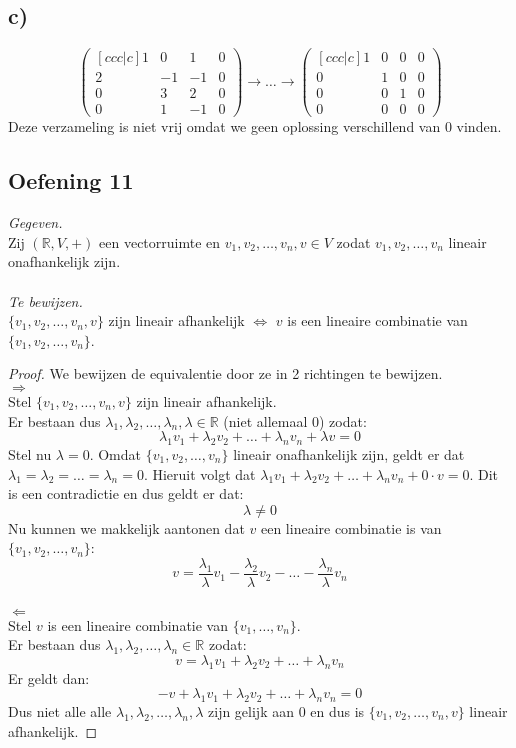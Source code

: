 \documentclass[lineaire_algebra_oplossingen.tex]{subfiles}
\begin{document}
\subsection*{c)}
\[
\begin{pmatrix}[ccc|c]
1 &  0 &  1 & 0 \\
2 & -1 & -1 & 0 \\
0 &  3 &  2 & 0 \\
0 &  1 & -1 & 0
\end{pmatrix}
\longrightarrow
\dots
\longrightarrow
\begin{pmatrix}[ccc|c]
1 & 0 & 0 & 0 \\
0 & 1 & 0 & 0 \\
0 & 0 & 1 & 0 \\
0 & 0 & 0 & 0
\end{pmatrix}
\]
Deze verzameling is niet vrij omdat we geen oplossing verschillend van 0 vinden.

\subsection{Oefening 11}
\textit{Gegeven.}\\
Zij $(\mathbb{R},V,+)$ een vectorruimte en $v_1,v_2,\ldots,v_n,v \in V$ zodat $v_1,v_2,\ldots,v_n$ lineair onafhankelijk zijn.\\\\
\textit{Te bewijzen.}\\
$\{v_1, v_2, \ldots, v_n, v\}$ zijn lineair afhankelijk $\Longleftrightarrow$ $v$ is een lineaire combinatie van $\{v_1,v_2,\ldots,v_n\}$.\\
\begin{proof} We bewijzen de equivalentie door ze in 2 richtingen te bewijzen.\\
$\Longrightarrow$\\
Stel $\{ v_1, v_2,\ldots, v_n, v \}$ zijn lineair afhankelijk.\\
Er bestaan dus $\lambda_1, \lambda_2,\ldots, \lambda_n, \lambda \in \mathbb{R}$ (niet allemaal 0) zodat:
\[ \lambda_1 v_1 + \lambda_2 v_2 +  \ldots + \lambda_n v_n + \lambda v = 0\]
Stel nu $\lambda = 0$. Omdat $\{v_1,v_2,\ldots,v_n\}$ lineair onafhankelijk zijn, geldt er dat $\lambda_1 = \lambda_2 = \ldots = \lambda_n = 0$. Hieruit volgt dat $\lambda_1 v_1 + \lambda_2 v_2 + \ldots + \lambda_n v_n + 0 \cdot v = 0$. Dit is een contradictie en dus geldt er dat:
\[
\lambda \neq 0
\]
Nu kunnen we makkelijk aantonen dat $v$ een lineaire combinatie is van $\{v_1,v_2,\ldots,v_n\}$:
\[
v = \frac{\lambda_1}{\lambda}v_1 - \frac{\lambda_2}{\lambda}v_2 - \ldots - \frac{\lambda_n}{\lambda}v_n
\]\\
$\Longleftarrow$\\
Stel $v$ is een lineaire combinatie van $\{v_1,\ldots,v_n\}$.\\
Er bestaan dus $\lambda_1, \lambda_2,\ldots, \lambda_n \in \mathbb{R}$ zodat:
\[
v = \lambda_1 v_1 + \lambda_2 v_2 +  \ldots + \lambda_n v_n
\]
Er geldt dan:
\[
-v + \lambda_1 v_1 + \lambda_2 v_2 +  \ldots + \lambda_n v_n = 0
\]
Dus niet alle alle $\lambda_1, \lambda_2,\ldots, \lambda_n, \lambda$ zijn gelijk aan 0 en dus is $\{v_1, v_2, \ldots, v_n, v\}$ lineair afhankelijk.
\end{proof}
 
\end{document}
